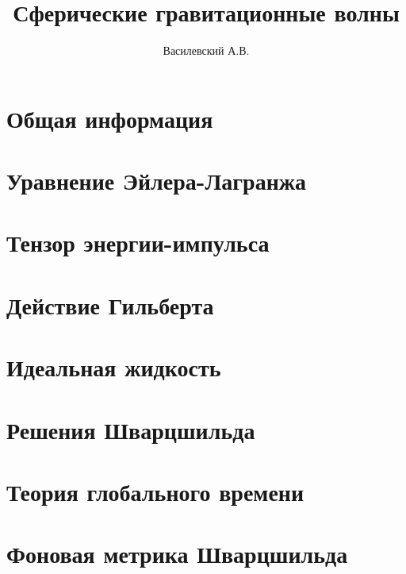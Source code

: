 \documentclass[12pt,a4paper]{article}
\title{Сферические гравитационные волны}
\author{Василевский А.В.}
\def\docroot{../..}
\begin{document}
    \makedocroot

    \maketitle
    \tableofcontents

    \begin{appendix}

        \section{Общая информация}
        

        \section{Уравнение Эйлера-Лагранжа}
        

        \section{Тензор энергии-импульса}
        

        \section{Действие Гильберта}
        

        \section{Идеальная жидкость}
        

        \section{Решения Шварцшильда}
        

        \section{Теория глобального времени}
        

        \section{Фоновая метрика Шварцшильда}
        


\end{appendix}
\end{document}
